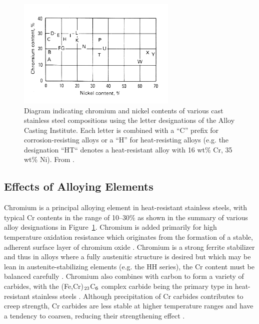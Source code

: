 \begin{figure}
\centering
\includegraphics[width=3in]{figures/aci-designation.png}
\caption[Diagram indicating chromium and nickel contents of various cast stainless steel compositions according to the letter designations of the Alloy Casting Institute.]{Diagram indicating chromium and nickel contents of various cast stainless steel compositions using the letter designations of the Alloy Casting Institute. Each letter is combined with a “C” prefix for corrosion-resisting alloys or a “H” for heat-resisting alloys (e.g. the designation “HT“ denotes a heat-resistant alloy with 16 wt\% Cr, 35 wt\% Ni). From \citet{blair_cast_stainless_1990}.}
\label{fig:aci-alloy-designations}
\end{figure}

\subsection{Effects of Alloying Elements}
Chromium is a principal alloying element in heat-resistant stainless steels, with typical Cr contents in the range of \numrange[range-phrase=--]{10}{30}\% as shown in the summary of various alloy designations in Figure~\ref{fig:aci-alloy-designations}. Chromium is added primarily for high temperature oxidation resistance which originates from the formation of a stable, adherent surface layer of chromium oxide \cite{kane_evolution_1991}. Chromium is a strong ferrite stabilizer \cite{folkhard_welding_1988} and thus in alloys where a fully austenitic structure is desired but which may be lean in austenite-stabilizing elements (e.g. the HH series), the Cr content must be balanced carefully \cite{avery_cast_1969}. Chromium also combines with carbon to form a variety of carbides, with the (Fe,Cr)$_\textnormal{23}$C$_\textnormal{6}$ complex carbide being the primary type in heat-resistant stainless steels \cite{sourmail_precipitation_2001}. Although precipitation of Cr carbides contributes to creep strength, Cr carbides are less stable at higher temperature ranges and have a tendency to coarsen, reducing their strengthening effect \cite{avery_cast_1969}.

